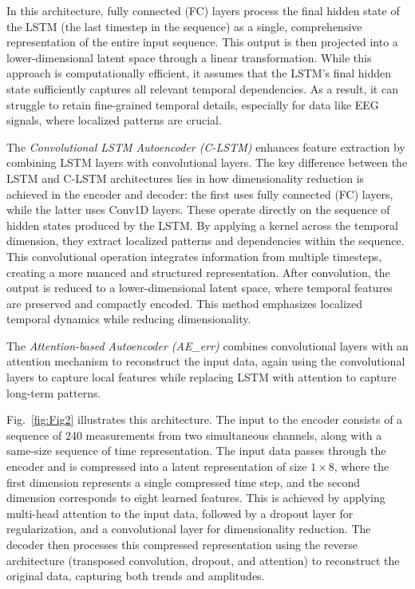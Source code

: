 \documentclass[conference]{IEEEtran}
\begin{document}
In this architecture, fully connected (FC) layers process the final
hidden state of the LSTM (the last timestep in the sequence) as a
single, comprehensive representation of the entire input
sequence. This output is then projected into a lower-dimensional
latent space through a linear transformation. While this approach is
computationally efficient, it assumes that the LSTM's final hidden
state sufficiently captures all relevant temporal dependencies. As a
result, it can struggle to retain fine-grained temporal details,
especially for data like EEG signals, where localized patterns are
crucial.

The \emph{Convolutional LSTM Autoencoder (C-LSTM)} enhances feature
extraction by combining LSTM layers with convolutional layers. The
key difference between the LSTM and C-LSTM architectures lies in how
dimensionality reduction is achieved in the encoder and decoder: the
first uses fully connected (FC) layers, while the latter uses
Conv1D layers. These operate directly on the sequence of hidden states
produced by the LSTM. By applying a kernel across the temporal
dimension, they extract localized patterns and dependencies within the
sequence. This convolutional operation integrates information from
multiple timesteps, creating a more nuanced and structured
representation. After convolution, the output is reduced to a
lower-dimensional latent space, where temporal features are preserved
and compactly encoded. This method emphasizes localized temporal
dynamics while reducing dimensionality.

The \emph{Attention-based Autoencoder (AE\_err)}
combines convolutional layers with an attention mechanism to
reconstruct the input data, again using the convolutional layers to
capture local features while replacing LSTM with attention to capture
long-term patterns.

Fig.~\ref{fig:Fig2} illustrates this architecture. The input to the
encoder consists of a sequence of 240 measurements from two
simultaneous channels, along with a same-size sequence of time
representation. The input data passes through the encoder and is
compressed into a latent representation of size \( 1 \times 8 \),
where the first dimension represents a single compressed time step,
and the second dimension corresponds to eight learned features. This
is achieved by applying multi-head attention to the input data,
followed by a dropout layer for regularization, and a convolutional
layer for dimensionality reduction. The decoder then processes this
compressed representation using the reverse architecture (transposed
convolution, dropout, and attention) to reconstruct the original data,
capturing both trends and amplitudes.
\end{document}
